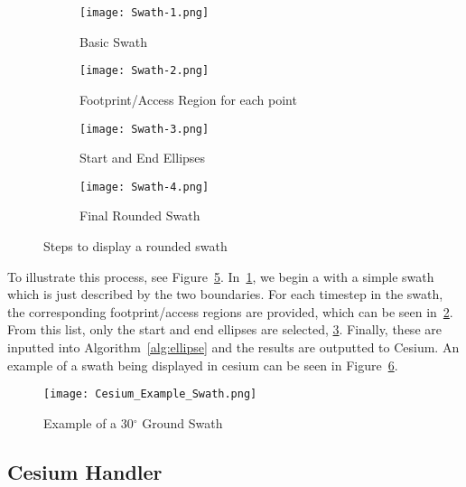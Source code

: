 \begin{description}
\begin{figure}
    \centering
    \begin{subfigure}[b]{0.45\textwidth}
	\texttt{[image: Swath-1.png]} 
	\caption{Basic Swath}
	\label{fig:swath-1}
    \end{subfigure}
    \hfill
    \begin{subfigure}[b]{0.45\textwidth}
	\texttt{[image: Swath-2.png]} 
	\caption{Footprint/Access Region for each point}
	\label{fig:swath-2}
    \end{subfigure}
    \begin{subfigure}[b]{0.45\textwidth}
	\texttt{[image: Swath-3.png]} 
	\caption{Start and End Ellipses}
	\label{fig:swath-3}
    \end{subfigure}
    \hfill
    \begin{subfigure}[b]{0.45\textwidth}
	\texttt{[image: Swath-4.png]} 
	\caption{Final Rounded Swath}
	\label{fig:swath-4}
    \end{subfigure}

    \caption{Steps to display a rounded swath}
    \label{fig:swath-steps}
\end{figure}

To illustrate this process, see Figure~\ref{fig:swath-steps}.
In~\ref{fig:swath-1}, we begin a with a simple swath which is just described by
the two boundaries. For each timestep in the swath, the corresponding
footprint/access regions are provided, which can be seen in~\ref{fig:swath-2}.
From this list, only the start and end ellipses are selected,
\ref{fig:swath-3}. Finally, these are inputted into Algorithm~\ref{alg:ellipse}
and the results are outputted to Cesium. An example of a swath being displayed
in cesium can be seen in Figure~\ref{fig:cesium_swath}.

\begin{figure}
    \centering
    \texttt{[image: Cesium\_Example\_Swath.png]} 
    \caption{Example of a 30$^\circ$ Ground Swath}
    \label{fig:cesium_swath}
\end{figure}

\end{description}


\subsection{Cesium Handler}

